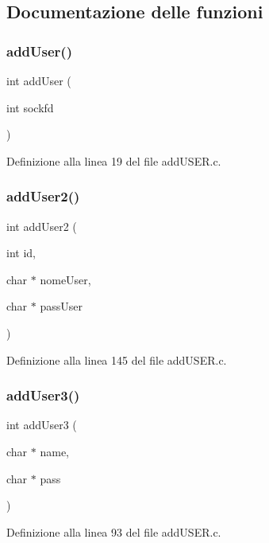 \subsection{Documentazione delle funzioni}
\mbox{\label{a00002_a3a8de8215b92820b1ceb58270cdc5f3c}} 
\subsubsection{\texorpdfstring{addUser()}{addUser()}}
{\footnotesize\ttfamily int add\+User (\begin{DoxyParamCaption}\item[{int}]{sockfd }\end{DoxyParamCaption})}



Definizione alla linea 19 del file add\+U\+S\+E\+R.\+c.

\mbox{\label{a00002_a52aa739667ce42876451c7b0286d6fe1}} 
\subsubsection{\texorpdfstring{addUser2()}{addUser2()}}
{\footnotesize\ttfamily int add\+User2 (\begin{DoxyParamCaption}\item[{int}]{id,  }\item[{char $\ast$}]{nome\+User,  }\item[{char $\ast$}]{pass\+User }\end{DoxyParamCaption})}



Definizione alla linea 145 del file add\+U\+S\+E\+R.\+c.

\mbox{\label{a00002_a7dd8a9a04f626345758eae934948a3ea}} 
\subsubsection{\texorpdfstring{addUser3()}{addUser3()}}
{\footnotesize\ttfamily int add\+User3 (\begin{DoxyParamCaption}\item[{char $\ast$}]{name,  }\item[{char $\ast$}]{pass }\end{DoxyParamCaption})}



Definizione alla linea 93 del file add\+U\+S\+E\+R.\+c.

